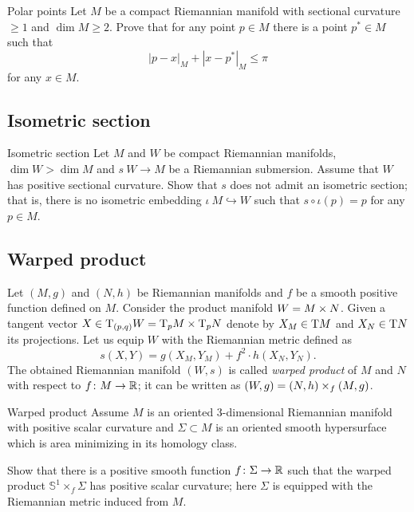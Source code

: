 \begin{pr}{\many}{Polar points}\label{milka-polar} 
Let $M$ be a compact Riemannian manifold with sectional curvature $\ge 1$ and $\dim M\ge 2$. 
Prove that for any point $p\in M$ there is a point $p^*\in M$ such that 
\[|p-x|_M+|x-p^*|_M\le \pi\]
for any $x\in M$.
\end{pr}

\subsection*{Isometric section\hard}

\begin{pr}{\hard}{Isometric section}\label{Isometric section}
Let $M$ and $W$ be compact Riemannian manifolds,
$\dim W>\dim M$
and $s\:W\to M$ be a Riemannian submersion.
Assume that $W$ has positive sectional curvature.
Show that $s$ does not admit an isometric section;
that is, there is no isometric embedding $\iota\:M\hookrightarrow W$ such that $s\circ\iota(p)=p$ for any $p\in M$.
\end{pr}

\subsection*{Warped product}

Let $(M,g)$ and $(N,h)$ be Riemannian manifolds 
and $f$ be a smooth positive function defined on $M$.
Consider the product manifold $W\z=M\times N$.
Given a tangent vector 
$X\z\in \T_{(p,q)} W
\z=\T_p M\times \T_p N$ denote by 
$X_M\z\in \T M$ and $X_N\z\in \T N$ its projections.
Let us equip $W$ with the Riemannian metric defined as
\[s(X,Y)=g(X_M,Y_M)+f^2\cdot h(X_N,Y_N).\]
The obtained Riemannian manifold $(W,s)$ is called \emph{warped product} of $M$ and $N$ with respect to $f\colon M\to \mathbb{R}$;
it can be written as  $(W,g)\z=(N,h)\times_f(M,g)$.

\begin{pr}{}{Warped product}\label{Warped product}
Assume $M$ is an oriented 3-dimensional Riemannian manifold with positive scalar curvature 
and $\Sigma\subset M$ is an oriented smooth hypersurface which is area minimizing in its homology class.

Show that there is a positive smooth function $f\colon\Sigma\to \mathbb{R}$
such that the warped product $\mathbb S^1\times_f \Sigma$
has positive scalar curvature;
here $\Sigma$ is equipped with the Riemannian metric
induced from $M$.
\end{pr}

